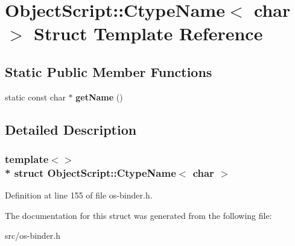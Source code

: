 \hypertarget{struct_object_script_1_1_ctype_name_3_01char_01_4}{}\section{Object\+Script\+:\+:Ctype\+Name$<$ char $>$ Struct Template Reference}
\label{struct_object_script_1_1_ctype_name_3_01char_01_4}
\subsection*{Static Public Member Functions}
\begin{DoxyCompactItemize}
\item 
static const char $\ast$ {\bfseries get\+Name} ()\hypertarget{struct_object_script_1_1_ctype_name_3_01char_01_4_adb071b2ed48c8cc03d0a534d7437a454}{}\label{struct_object_script_1_1_ctype_name_3_01char_01_4_adb071b2ed48c8cc03d0a534d7437a454}

\end{DoxyCompactItemize}


\subsection{Detailed Description}
\subsubsection*{template$<$$>$\\*
struct Object\+Script\+::\+Ctype\+Name$<$ char $>$}



Definition at line 155 of file os-\/binder.\+h.



The documentation for this struct was generated from the following file\+:\begin{DoxyCompactItemize}
\item 
src/os-\/binder.\+h\end{DoxyCompactItemize}
